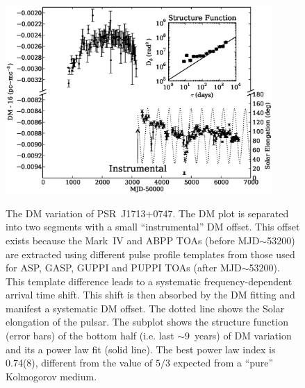 \documentclass[12pt,preprint]{aastex}
\begin{document}
\begin{figure}
\includegraphics[width=4in]{DMX.ps} \\ 
\caption {\label{fig:dmx} The DM variation of PSR~J1713+0747. The DM plot is
separated into two segments with a small ``instrumental'' DM offset. This offset exists 
because the Mark~IV and ABPP TOAs (before MJD$\sim$53200) are extracted using
different pulse
profile templates from those used for ASP, GASP, GUPPI and PUPPI TOAs (after
MJD$\sim$53200). This template difference leads to a systematic
frequency-dependent arrival time shift. This shift is then absorbed by the DM
fitting and manifest a systematic DM offset. The dotted line shows the Solar
elongation of the pulsar. The subplot shows the structure
function (error bars) of the bottom half (i.e. last $\sim 9$~years) of DM
variation and its a power law fit (solid line). The best power law index is
0.74(8), different from the value of $5/3$ expected from a
``pure'' Kolmogorov medium. } 
\end{figure} 
\end{document}
